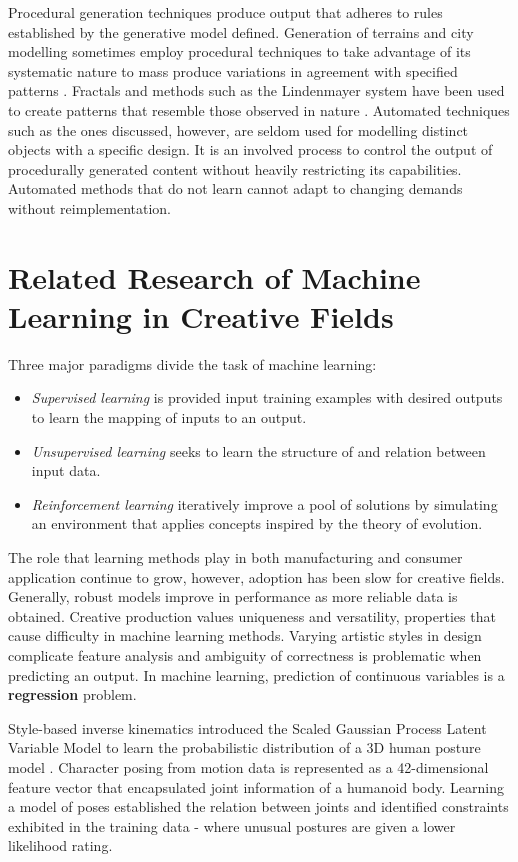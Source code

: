 \documentclass[ %
author={Dillon Keith Diep},
supervisor={Dr. Carl Henrik Ek},
degree={MEng},
title={ART-CG:},
subtitle={Assisted Real-time Content Generation of 3D Hair by Learning Manifolds},
type={Research},
year={2017} ]{dissertation}
\begin{document}
Procedural generation techniques produce output that adheres to rules established by the generative model defined. Generation of terrains and city modelling sometimes employ procedural techniques to take advantage of its systematic nature to mass produce variations in agreement with specified patterns \cite{procedural1}. Fractals and methods such as the Lindenmayer system have been used to create patterns that resemble those observed in nature \cite{lsystem}. Automated techniques such as the ones discussed, however, are seldom used for modelling distinct objects with a specific design. It is an involved process to control the output of procedurally generated content without heavily restricting its capabilities. Automated methods that do not learn cannot adapt to changing demands without reimplementation.

\section{Related Research of Machine Learning in Creative Fields}
Three major paradigms divide the task of machine learning:
\begin{itemize}
	\item \textit{Supervised learning} is provided input training examples with desired outputs to learn the mapping of inputs to an output.
	\item \textit{Unsupervised learning} seeks to learn the structure of and relation between input data.
	\item \textit{Reinforcement learning} iteratively improve a pool of solutions by simulating an environment that applies concepts inspired by the theory of evolution.
\end{itemize}
The role that learning methods play in both manufacturing and consumer application continue to grow, however, adoption has been slow for creative fields.  Generally, robust models improve in performance as more reliable data is obtained. Creative production values uniqueness and versatility, properties that cause difficulty in machine learning methods. Varying artistic styles in design complicate feature analysis and ambiguity of correctness is problematic when predicting an output. In machine learning, prediction of continuous variables is a \textbf{regression} problem. 

Style-based inverse kinematics introduced the Scaled Gaussian Process Latent Variable Model to learn the probabilistic distribution of a 3D human posture model \cite{styleik}. Character posing from motion data is represented as a 42-dimensional feature vector that encapsulated joint information of a humanoid body. Learning a model of poses established the relation between joints and identified constraints exhibited in the training data - where unusual postures are given a lower likelihood rating.
\end{document}

